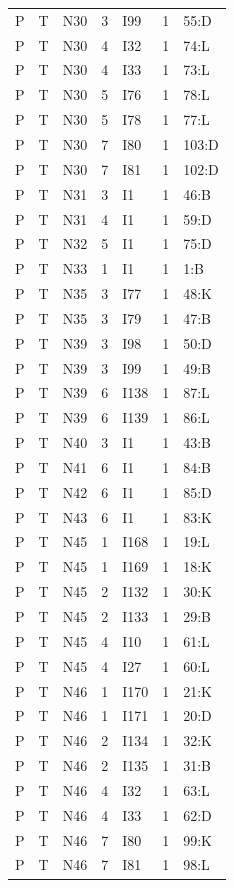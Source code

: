 {\begin{longtable}{lllrlrp{.35\linewidth}}
P & T & N30 & 3 & I99 & 1 & 55:D \\
P & T & N30 & 4 & I32 & 1 & 74:L \\
P & T & N30 & 4 & I33 & 1 & 73:L \\
P & T & N30 & 5 & I76 & 1 & 78:L \\
P & T & N30 & 5 & I78 & 1 & 77:L \\
P & T & N30 & 7 & I80 & 1 & 103:D \\
P & T & N30 & 7 & I81 & 1 & 102:D \\
P & T & N31 & 3 & I1 & 1 & 46:B \\
P & T & N31 & 4 & I1 & 1 & 59:D \\
P & T & N32 & 5 & I1 & 1 & 75:D \\
P & T & N33 & 1 & I1 & 1 & 1:B \\
P & T & N35 & 3 & I77 & 1 & 48:K \\
P & T & N35 & 3 & I79 & 1 & 47:B \\
P & T & N39 & 3 & I98 & 1 & 50:D \\
P & T & N39 & 3 & I99 & 1 & 49:B \\
P & T & N39 & 6 & I138 & 1 & 87:L \\
P & T & N39 & 6 & I139 & 1 & 86:L \\
P & T & N40 & 3 & I1 & 1 & 43:B \\
P & T & N41 & 6 & I1 & 1 & 84:B \\
P & T & N42 & 6 & I1 & 1 & 85:D \\
P & T & N43 & 6 & I1 & 1 & 83:K \\
P & T & N45 & 1 & I168 & 1 & 19:L \\
P & T & N45 & 1 & I169 & 1 & 18:K \\
P & T & N45 & 2 & I132 & 1 & 30:K \\
P & T & N45 & 2 & I133 & 1 & 29:B \\
P & T & N45 & 4 & I10 & 1 & 61:L \\
P & T & N45 & 4 & I27 & 1 & 60:L \\
P & T & N46 & 1 & I170 & 1 & 21:K \\
P & T & N46 & 1 & I171 & 1 & 20:D \\
P & T & N46 & 2 & I134 & 1 & 32:K \\
P & T & N46 & 2 & I135 & 1 & 31:B \\
P & T & N46 & 4 & I32 & 1 & 63:L \\
P & T & N46 & 4 & I33 & 1 & 62:D \\
P & T & N46 & 7 & I80 & 1 & 99:K \\
P & T & N46 & 7 & I81 & 1 & 98:L \\

\end{longtable}}
